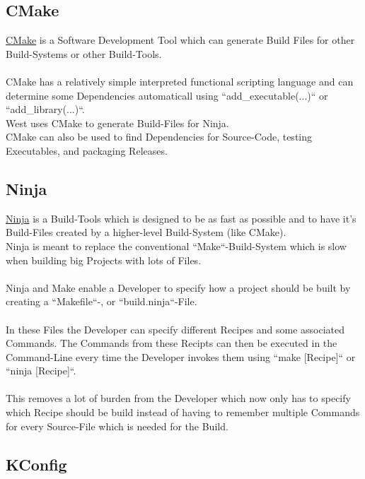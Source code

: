 \pagebreak

\subsection{CMake}

\href{https://cmake.org/}
{CMake} is a Software Development Tool which can generate Build Files for other
Build-Systems or other Build-Tools.
\\
\\
CMake has a relatively simple interpreted functional scripting language and can
determine some Dependencies automaticall using ``add\_executable(...)`` or ``add\_library(...)``.
\\
West uses CMake to generate Build-Files for Ninja.
\\
CMake can also be used to find Dependencies for Source-Code, testing Executables,
and packaging Releases.

\subsection{Ninja}

\href{https://ninja-build.org/}{Ninja} is a Build-Tools which is designed to be
as fast as possible and to have it's Build-Files created by a higher-level
Build-System (like CMake).
\\
Ninja is meant to replace the conventional ``Make``-Build-System which is slow
when building big Projects with lots of Files.
\\
\\
Ninja and Make enable a Developer to specify how a project should be built
by creating a ``Makefile``-, or ``build.ninja``-File.
\\
\\
In these Files the Developer can specify different Recipes and some associated
Commands. The Commands from these Recipts can then be executed in the Command-Line
every time the Developer invokes them using ``make [Recipe]`` or ``ninja [Recipe]``.
\\
\\
This removes a lot of burden from the Developer which now only has to
specify which Recipe should be build instead of having to remember multiple
Commands for every Source-File which is needed for the Build.

\pagebreak

\subsection{KConfig}

